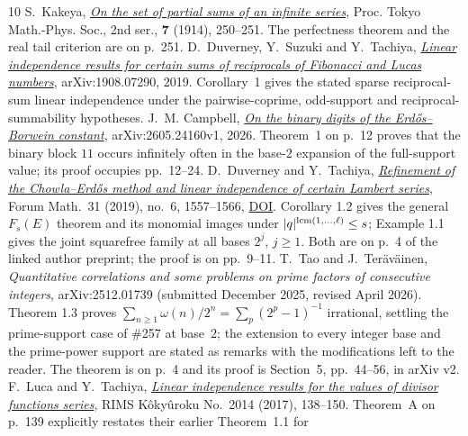 \documentclass[11pt]{article}
\begin{document}
\begin{thebibliography}{10}
 S.~Kakeya,
  \href{https://doi.org/10.11429/ptmps1907.7.14_250}
  {\emph{On the set of partial sums of an infinite series}},
  Proc. Tokyo Math.-Phys. Soc., 2nd ser., \textbf{7} (1914), 250--251.
  The perfectness theorem and the real tail criterion are on p.~251.
 D.~Duverney, Y.~Suzuki and Y.~Tachiya,
  \href{https://arxiv.org/abs/1908.07290}
  {\emph{Linear independence results for certain sums of reciprocals of
  Fibonacci and Lucas numbers}}, arXiv:1908.07290, 2019.
  Corollary~1 gives the stated sparse reciprocal-sum linear independence
  under the pairwise-coprime, odd-support and reciprocal-summability
  hypotheses.
 J.~M. Campbell,
  \href{https://arxiv.org/abs/2605.24160}
  {\emph{On the binary digits of the Erd\H{o}s--Borwein constant}},
  arXiv:2605.24160v1, 2026.  Theorem~1 on p.~12 proves that the binary block
  \(11\) occurs infinitely often in the base-\(2\) expansion of the
  full-support value; its proof occupies pp.~12--24.
 D.~Duverney and Y.~Tachiya,
  \href{https://danielduverney.fr/documents/theorie-des-nombres/DuverneyTachiya190522.pdf}
  {\emph{Refinement of the Chowla--Erd\H{o}s method and linear independence
  of certain Lambert series}},
  Forum Math.\ 31 (2019), no.~6, 1557--1566,
  \href{https://doi.org/10.1515/forum-2018-0299}{DOI}.  Corollary 1.2 gives
  the general $F_s(E)$ theorem and its monomial images under
  $|q|^{\operatorname{lcm}(1,\dots,\ell)}\le s$; Example 1.1 gives the joint squarefree
  family at all bases \(2^j\), \(j\ge1\).  Both are on p.~4 of the linked
  author preprint; the proof is on pp.~9--11.
 T.~Tao and J.~Ter\"av\"ainen,
  \emph{Quantitative correlations and some problems on prime factors of
  consecutive integers}, arXiv:2512.01739 (submitted December 2025, revised
  April 2026).  Theorem 1.3 proves $\sum_{n\ge1}\omega(n)/2^n=\sum_p(2^p-1)^{-1}$
  irrational, settling the prime-support case of \#257 at base~$2$; the
  extension to every integer base and the prime-power support are stated as
  remarks with the modifications left to the reader.  The theorem is on
  p.~4 and its proof is Section~5, pp.~44--56, in arXiv v2.
 F.~Luca and Y.~Tachiya,
  \href{https://www.kurims.kyoto-u.ac.jp/~kyodo/kokyuroku/contents/pdf/2014-14.pdf}
  {\emph{Linear independence results for the values of divisor functions
  series}}, RIMS K\^oky\^uroku No.~2014 (2017), 138--150.
  Theorem~A on p.~139 explicitly restates their earlier Theorem~1.1 for

\end{thebibliography}
\end{document}
